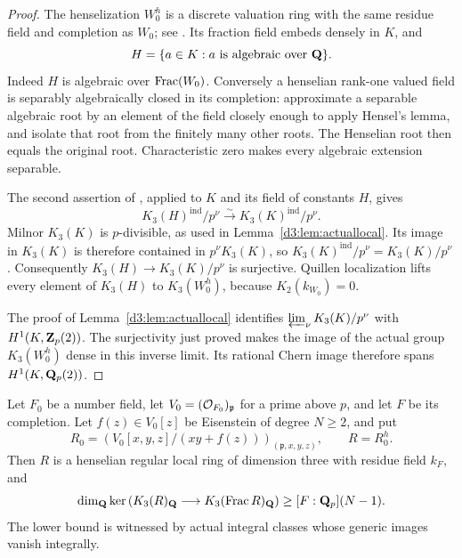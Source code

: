 \begin{proof}
The henselization $W_0^h$ is a discrete valuation ring with the same
residue field and completion as $W_0$; see
\cite[Section~15.46, Lemmas~15.46.1, 15.46.3 and 15.46.11]{StacksHenselization}.
Its fraction field embeds densely in $K$, and
\[
H=\{a\in K:a\text{ is algebraic over }\mathbf Q\}.
\]
Indeed $H$ is algebraic over $\operatorname{Frac}(W_0)$.  Conversely a henselian
rank-one valued field is separably algebraically closed in its completion:
approximate a separable algebraic root by an element of the field closely
enough to apply Hensel's lemma, and isolate that root from the finitely
many other roots.  The Henselian root then equals the original root.
Characteristic zero makes every algebraic extension separable.

The second assertion of \cite[Theorem~4.13, p.~336]{LevineIndK3},
applied to $K$ and its field of constants $H$, gives
\[
K_3(H)^{\mathrm{ind}}/p^\nu
\xrightarrow{\sim}K_3(K)^{\mathrm{ind}}/p^\nu.
\]
Milnor $K_3(K)$ is $p$-divisible, as used in
Lemma~\ref{d3:lem:actuallocal}.  Its image in $K_3(K)$ is therefore
contained in $p^\nu K_3(K)$, so
$K_3(K)^{\mathrm{ind}}/p^\nu=K_3(K)/p^\nu$.
Consequently $K_3(H)\to K_3(K)/p^\nu$ is surjective.
Quillen localization lifts every element of $K_3(H)$ to $K_3(W_0^h)$,
because $K_2(k_{W_0})=0$.

The proof of Lemma~\ref{d3:lem:actuallocal} identifies
$\varprojlim_\nu K_3(K)/p^\nu$ with $H^1(K,\mathbf Z_p(2))$.
The surjectivity just proved makes the image of the actual group
$K_3(W_0^h)$ dense in this inverse limit.  Its rational Chern image
therefore spans $H^1(K,\mathbf Q_p(2))$.
\end{proof}

\begin{theorem}
\label{d3:thm:henselianeisensteinrank}
Let $F_0$ be a number field, let $V_0=(\mathcal O_{F_0})_{\mathfrak p}$ for a
prime above $p$, and let $F$ be its completion.  Let $f(z)\in V_0[z]$
be Eisenstein of degree $N\geq2$, and put
\[
R_0=\left(V_0[x,y,z]/(xy+f(z))\right)_{(\mathfrak p,x,y,z)},
\qquad R=R_0^h.
\]
Then $R$ is a henselian regular local ring of dimension three with
residue field $k_F$, and
\[
\dim_{\mathbf Q}\ker\left(K_3(R)_{\mathbf Q}\longrightarrow
K_3(\operatorname{Frac} R)_{\mathbf Q}\right)\geq [F:\mathbf Q_p](N-1).
\]
The lower bound is witnessed by actual integral classes whose generic
images vanish integrally.
\end{theorem}

